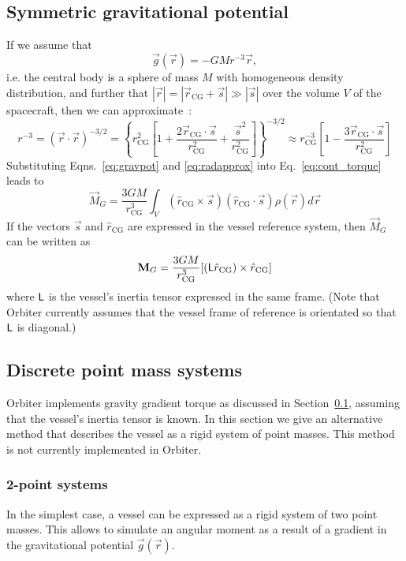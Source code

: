 \documentclass[Orbiter Technical Reference.tex]{subfiles}
\begin{document}
\subsection{Symmetric gravitational potential}\label{sec:sympot}
If we assume that
\begin{equation}\label{eq:gravpot}
\vec{g}(\vec{r}) = -GMr^{-3}\vec{r},
\end{equation}
i.e. the central body is a sphere of mass $M$ with homogeneous density distribution, and further that $|\vec{r}| = |\vec{r}_\text{CG} + \vec{s}| \gg |\vec{s}|$ over the volume $V$ of the spacecraft, then we can approximate~\cite{wertz1978}:
\begin{equation}\label{eq:radapprox}
r^{-3} = (\vec{r}\cdot\vec{r})^{-3/2} =
\left\{ r_\text{CG}^2 \left[ 1 + \frac{2\vec{r}_\text{CG}\cdot\vec{s}}{r_\text{CG}^2} + \frac{\vec{s}^2}{r_\text{CG}^2} \right] \right\}^{-3/2} \approx
r_\text{CG}^{-3} \left[ 1 - \frac{3 \vec{r}_\text{CG}\cdot\vec{s}}{r_\text{CG}^2} \right]
\end{equation}
Substituting Eqns.~\ref{eq:gravpot} and \ref{eq:radapprox} into Eq.~\ref{eq:cont_torque} leads to
\begin{equation}
\vec{M}_G = \frac{3GM}{r_\text{CG}^3} \int_V (\hat{r}_\text{CG} \times \vec{s}) (\hat{r}_\text{CG} \cdot \vec{s}) \rho(\vec{r}) d\vec{r}
\end{equation}
If the vectors $\vec{s}$ and $\hat{r}_\text{CG}$ are expressed in the vessel reference system, then $\vec{M}_G$ can be written as
\begin{equation}
\mathbf{M}_G = \frac{3GM}{r_\text{CG}^3} [(\mathsf{L}\hat{r}_\text{CG}) \times \hat{r}_\text{CG}]
\end{equation}
where $\mathsf{L}$ is the vessel's inertia tensor expressed in the same frame. (Note that Orbiter currently assumes that the vessel frame of reference is orientated so that $\mathsf{L}$ is diagonal.)


\subsection{Discrete point mass systems}
Orbiter implements gravity gradient torque as discussed in Section~\ref{sec:sympot}, assuming that the vessel's inertia tensor is known. In this section we give an alternative method that describes the vessel as a rigid system of point masses. This method is not currently implemented in Orbiter.

\subsubsection{2-point systems}
In the simplest case, a vessel can be expressed as a rigid system of two point masses. This allows to simulate an angular moment as a result of a gradient in the gravitational potential $\vec{g}(\vec{r})$.
\end{document}

